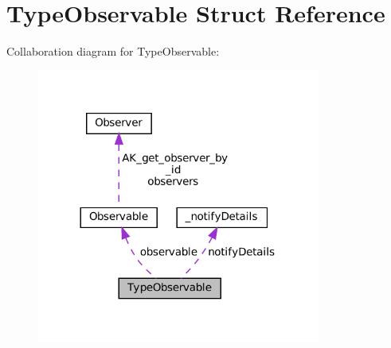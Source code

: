 \hypertarget{structTypeObservable}{}\section{Type\+Observable Struct Reference}
\label{structTypeObservable}


Collaboration diagram for Type\+Observable\+:\nopagebreak
\begin{figure}[H]
\begin{center}
\leavevmode
\includegraphics[width=264pt]{structTypeObservable__coll__graph}
\end{center}
\end{figure}

